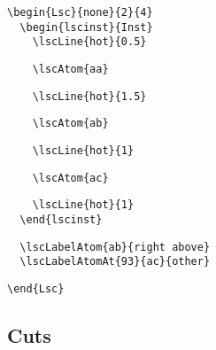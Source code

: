 \documentclass{article}
\begin{document}
\begin{center}%
\begin{minipage}{0.3\textwidth}
\end{minipage}
\hfill
\begin{minipage}{0.45\textwidth}%
\small%
{\gray\begin{verbatim}
\begin{Lsc}{none}{2}{4}
  \begin{lscinst}{Inst}
    \lscLine{hot}{0.5}
\end{verbatim}}%
\verbunskip%
{\begin{verbatim}
    \lscAtom{aa}
\end{verbatim}}%
\verbunskip%
{\gray\begin{verbatim}
    \lscLine{hot}{1.5}
\end{verbatim}}%
\verbunskip%
{\begin{verbatim}
    \lscAtom{ab}
\end{verbatim}}%
\verbunskip%
{\gray\begin{verbatim}
    \lscLine{hot}{1}
\end{verbatim}}%
\verbunskip%
{\begin{verbatim}
    \lscAtom{ac}
\end{verbatim}}%
\verbunskip%
{\gray\begin{verbatim}
    \lscLine{hot}{1}
  \end{lscinst}
\end{verbatim}}%
\verbunskip%
{\begin{verbatim}
  \lscLabelAtom{ab}{right above}
  \lscLabelAtomAt{93}{ac}{other}
\end{verbatim}}%
\verbunskip%
{\gray\begin{verbatim}
\end{Lsc}
\end{verbatim}}%
\end{minipage}
\end{center}%

\subsection{Cuts}
\label{sec:tech:cut}
\end{document}
